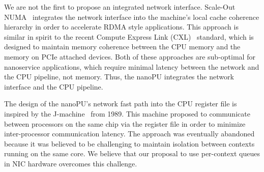 We are not the first to propose an integrated network interface.
Scale-Out NUMA~\cite{scale-out-numa} integrates the network interface into the machine's local cache coherence hierarchy in order to accelerate RDMA style applications.
This approach is similar in spirit to the recent Compute Express Link (CXL)~\cite{cxl} standard, which is designed to maintain memory coherence between the CPU memory and the memory on PCIe attached devices.
Both of these approaches are sub-optimal for nanoservice applications, which require minimal latency between the network and the CPU pipeline, not memory.
Thus, the nanoPU integrates the network interface and the CPU pipeline.

The design of the nanoPU's network fast path into the CPU register file is inspired by the J-machine~\cite{jmachine} from 1989.
This machine proposed to communicate between processors on the same chip via the register file in order to minimize inter-processor communication latency.
The approach was eventually abandoned because it was believed to be challenging to maintain isolation between contexts running on the same core.
We believe that our proposal to use per-context queues in NIC hardware overcomes this challenge.

